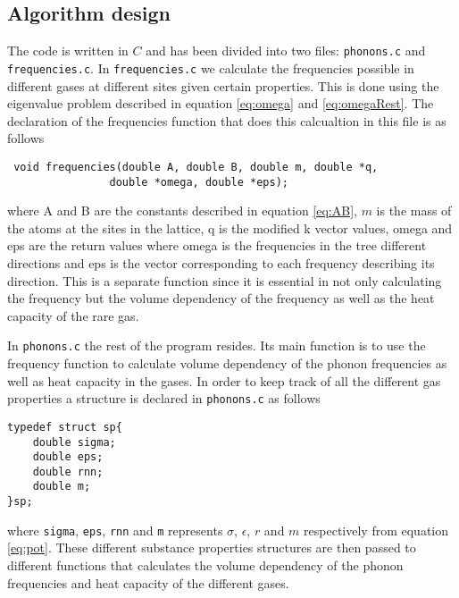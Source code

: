 \documentclass[11pt]{article}
\begin{document}
\subsection{Algorithm design}
The code is written in $C$ and has been divided into two files: \verb+phonons.c+ and \verb+frequencies.c+. In \verb+frequencies.c+ we calculate the frequencies possible in different gases at different sites given certain properties. This is done using the eigenvalue problem described in equation \ref{eq:omega} and \ref{eq:omegaRest}. The declaration of the frequencies function that does this calcualtion in this file is as follows
\begin{lstlisting}
 void frequencies(double A, double B, double m, double *q, 
				double *omega, double *eps);
\end{lstlisting}
where A and B are the constants described in equation \ref{eq:AB}, $m$ is the mass of the atoms at the sites in the lattice, q is the modified k vector values, omega and eps are the return values where omega is the frequencies in the tree different directions and eps is the vector corresponding to each frequency describing its direction. This is a separate function since it is essential in not only calculating the frequency but the volume dependency of the frequency as well as the heat capacity of the rare gas. 

In \verb+phonons.c+ the rest of the program resides. Its main function is to use the frequency function to calculate volume dependency of the phonon frequencies as well as heat capacity in the gases. In order to keep track of all the different gas properties a structure is declared in \verb+phonons.c+ as follows
\begin{lstlisting}
typedef struct sp{
	double sigma;
	double eps;
	double rnn;
	double m;
}sp;
\end{lstlisting}
where \verb+sigma+, \verb+eps+, \verb+rnn+ and \verb+m+ represents $\sigma$, $\epsilon$, $r$ and $m$ respectively from equation \ref{eq:pot}. These different substance properties structures are then passed to different functions that calculates the volume dependency of the phonon frequencies and heat capacity of the different gases.
\end{document}
